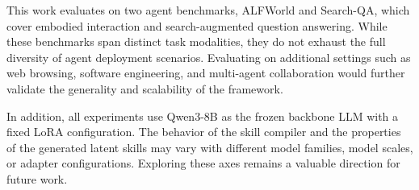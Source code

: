 This work evaluates \method{} on two agent benchmarks, ALFWorld and Search-QA, which cover embodied interaction and search-augmented question answering. While these benchmarks span distinct task modalities, they do not exhaust the full diversity of agent deployment scenarios. Evaluating on additional settings such as web browsing, software engineering, and multi-agent collaboration would further validate the generality and scalability of the framework.

In addition, all experiments use Qwen3-8B as the frozen backbone LLM with a fixed LoRA configuration. The behavior of the skill compiler and the properties of the generated latent skills may vary with different model families, model scales, or adapter configurations. Exploring these axes remains a valuable direction for future work.